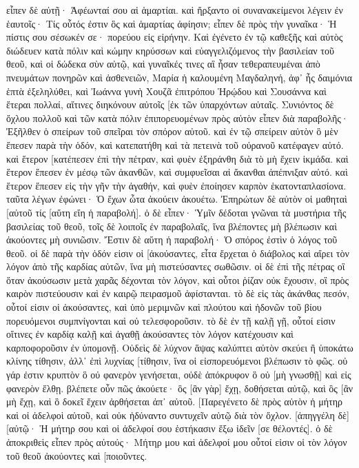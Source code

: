 εἶπεν δὲ αὐτῇ· Ἀφέωνταί σου αἱ ἁμαρτίαι. 
καὶ ἤρξαντο οἱ συνανακείμενοι λέγειν ἐν ἑαυτοῖς· Τίς οὗτός ἐστιν ὃς καὶ ἁμαρτίας ἀφίησιν; 
εἶπεν δὲ πρὸς τὴν γυναῖκα· Ἡ πίστις σου σέσωκέν σε· πορεύου εἰς εἰρήνην. 
Καὶ ἐγένετο ἐν τῷ καθεξῆς καὶ αὐτὸς διώδευεν κατὰ πόλιν καὶ κώμην κηρύσσων καὶ εὐαγγελιζόμενος τὴν βασιλείαν τοῦ θεοῦ, καὶ οἱ δώδεκα σὺν αὐτῷ, 
καὶ γυναῖκές τινες αἳ ἦσαν τεθεραπευμέναι ἀπὸ πνευμάτων πονηρῶν καὶ ἀσθενειῶν, Μαρία ἡ καλουμένη Μαγδαληνή, ἀφ᾽ ἧς δαιμόνια ἑπτὰ ἐξεληλύθει, 
καὶ Ἰωάννα γυνὴ Χουζᾶ ἐπιτρόπου Ἡρῴδου καὶ Σουσάννα καὶ ἕτεραι πολλαί, αἵτινες διηκόνουν αὐτοῖς [ἐκ τῶν ὑπαρχόντων αὐταῖς. 
Συνιόντος δὲ ὄχλου πολλοῦ καὶ τῶν κατὰ πόλιν ἐπιπορευομένων πρὸς αὐτὸν εἶπεν διὰ παραβολῆς· 
Ἐξῆλθεν ὁ σπείρων τοῦ σπεῖραι τὸν σπόρον αὐτοῦ. καὶ ἐν τῷ σπείρειν αὐτὸν ὃ μὲν ἔπεσεν παρὰ τὴν ὁδόν, καὶ κατεπατήθη καὶ τὰ πετεινὰ τοῦ οὐρανοῦ κατέφαγεν αὐτό. 
καὶ ἕτερον [κατέπεσεν ἐπὶ τὴν πέτραν, καὶ φυὲν ἐξηράνθη διὰ τὸ μὴ ἔχειν ἰκμάδα. 
καὶ ἕτερον ἔπεσεν ἐν μέσῳ τῶν ἀκανθῶν, καὶ συμφυεῖσαι αἱ ἄκανθαι ἀπέπνιξαν αὐτό. 
καὶ ἕτερον ἔπεσεν εἰς τὴν γῆν τὴν ἀγαθήν, καὶ φυὲν ἐποίησεν καρπὸν ἑκατονταπλασίονα. ταῦτα λέγων ἐφώνει· Ὁ ἔχων ὦτα ἀκούειν ἀκουέτω. 
Ἐπηρώτων δὲ αὐτὸν οἱ μαθηταὶ [αὐτοῦ τίς [αὕτη εἴη ἡ παραβολή]. 
ὁ δὲ εἶπεν· Ὑμῖν δέδοται γνῶναι τὰ μυστήρια τῆς βασιλείας τοῦ θεοῦ, τοῖς δὲ λοιποῖς ἐν παραβολαῖς, ἵνα βλέποντες μὴ βλέπωσιν καὶ ἀκούοντες μὴ συνιῶσιν. 
Ἔστιν δὲ αὕτη ἡ παραβολή· Ὁ σπόρος ἐστὶν ὁ λόγος τοῦ θεοῦ. 
οἱ δὲ παρὰ τὴν ὁδόν εἰσιν οἱ [ἀκούσαντες, εἶτα ἔρχεται ὁ διάβολος καὶ αἴρει τὸν λόγον ἀπὸ τῆς καρδίας αὐτῶν, ἵνα μὴ πιστεύσαντες σωθῶσιν. 
οἱ δὲ ἐπὶ τῆς πέτρας οἳ ὅταν ἀκούσωσιν μετὰ χαρᾶς δέχονται τὸν λόγον, καὶ οὗτοι ῥίζαν οὐκ ἔχουσιν, οἳ πρὸς καιρὸν πιστεύουσιν καὶ ἐν καιρῷ πειρασμοῦ ἀφίστανται. 
τὸ δὲ εἰς τὰς ἀκάνθας πεσόν, οὗτοί εἰσιν οἱ ἀκούσαντες, καὶ ὑπὸ μεριμνῶν καὶ πλούτου καὶ ἡδονῶν τοῦ βίου πορευόμενοι συμπνίγονται καὶ οὐ τελεσφοροῦσιν. 
τὸ δὲ ἐν τῇ καλῇ γῇ, οὗτοί εἰσιν οἵτινες ἐν καρδίᾳ καλῇ καὶ ἀγαθῇ ἀκούσαντες τὸν λόγον κατέχουσιν καὶ καρποφοροῦσιν ἐν ὑπομονῇ. 
Οὐδεὶς δὲ λύχνον ἅψας καλύπτει αὐτὸν σκεύει ἢ ὑποκάτω κλίνης τίθησιν, ἀλλ᾽ ἐπὶ λυχνίας [τίθησιν, ἵνα οἱ εἰσπορευόμενοι βλέπωσιν τὸ φῶς. 
οὐ γάρ ἐστιν κρυπτὸν ὃ οὐ φανερὸν γενήσεται, οὐδὲ ἀπόκρυφον ὃ οὐ [μὴ γνωσθῇ] καὶ εἰς φανερὸν ἔλθῃ. 
βλέπετε οὖν πῶς ἀκούετε· ὃς [ἂν γὰρ] ἔχῃ, δοθήσεται αὐτῷ, καὶ ὃς [ἂν μὴ ἔχῃ, καὶ ὃ δοκεῖ ἔχειν ἀρθήσεται ἀπ᾽ αὐτοῦ. 
[Παρεγένετο δὲ πρὸς αὐτὸν ἡ μήτηρ καὶ οἱ ἀδελφοὶ αὐτοῦ, καὶ οὐκ ἠδύναντο συντυχεῖν αὐτῷ διὰ τὸν ὄχλον. 
[ἀπηγγέλη δὲ] [αὐτῷ· Ἡ μήτηρ σου καὶ οἱ ἀδελφοί σου ἑστήκασιν ἔξω ἰδεῖν [σε θέλοντές]. 
ὁ δὲ ἀποκριθεὶς εἶπεν πρὸς αὐτούς· Μήτηρ μου καὶ ἀδελφοί μου οὗτοί εἰσιν οἱ τὸν λόγον τοῦ θεοῦ ἀκούοντες καὶ [ποιοῦντες. 
